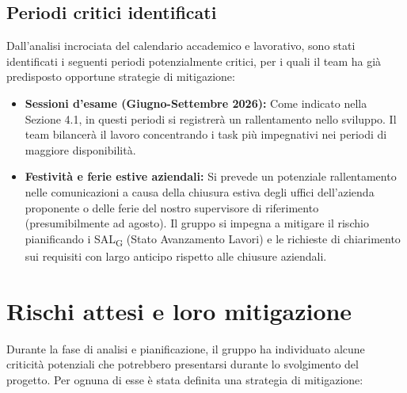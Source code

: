 \documentclass[11pt, a4paper]{article}
\begin{document}
	\subsection{Periodi critici identificati}
	Dall'analisi incrociata del calendario accademico e lavorativo, sono stati identificati i seguenti periodi potenzialmente critici, per i quali il team ha già predisposto opportune strategie di mitigazione:
	\begin{itemize}
		\item \textbf{Sessioni d'esame (Giugno-Settembre 2026):} Come indicato nella Sezione 4.1, in questi periodi si registrerà un rallentamento nello sviluppo. Il team bilancerà il lavoro concentrando i task più impegnativi nei periodi di maggiore disponibilità.
		\item \textbf{Festività e ferie estive aziendali:} Si prevede un potenziale rallentamento nelle comunicazioni a causa della chiusura estiva degli uffici dell'azienda proponente o delle ferie del nostro supervisore di riferimento (presumibilmente ad agosto). Il gruppo si impegna a mitigare il rischio pianificando i SAL\textsubscript{G} (Stato Avanzamento Lavori) e le richieste di chiarimento sui requisiti con largo anticipo rispetto alle chiusure aziendali.
	\end{itemize}
	
	\newpage
	\section{Rischi attesi e loro mitigazione}
	Durante la fase di analisi e pianificazione, il gruppo ha individuato alcune criticità potenziali che potrebbero presentarsi durante lo svolgimento del progetto. Per ognuna di esse è stata definita una strategia di mitigazione:
	
\end{document}
